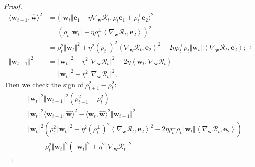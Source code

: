 \documentclass[pdflatex,sn-basic]{sn-jnl}%
\theoremstyle{thmstyleone}%
\begin{document}
\begin{appendices}
\begin{proof}
\begin{equation*}
  \begin{aligned}
    \langle \mathbf{w}_{t+1}, \hat{\mathbf{w}} \rangle^2 
    & = 
    \langle 
      \Vert \mathbf{w}_t \Vert \mathbf{e}_1 - \eta \nabla_{\mathbf{w}} \mathcal{R}_t, 
      \rho_t \mathbf{e}_1 + \rho_t^{\perp} \mathbf{e}_2
    \rangle^2 
    \\ & = 
    \left(
      \rho_t \Vert \mathbf{w}_t \Vert
      -
      \eta \rho_t^{\perp} \left\langle \nabla_{\mathbf{w}} \mathcal{R}_t, \mathbf{e}_2\right\rangle
    \right)^2
    \\ & = 
    \rho_t^2 \Vert \mathbf{w}_t \Vert^2
    +
    \eta^2 \left(\rho_t^{\perp}\right)^2 \left\langle \nabla_{\mathbf{w}} \mathcal{R}_t, \mathbf{e}_2 \right\rangle^2
    - 2 \eta \rho_t^{\perp}
    \rho_t \Vert \mathbf{w}_t \Vert
    \left\langle \nabla_{\mathbf{w}} \mathcal{R}_t, \mathbf{e}_2\right\rangle;
    \\
    \Vert \mathbf{w}_{t+1} \Vert^2 
    & = 
    \Vert \mathbf{w}_{t} \Vert^2
    + 
    \eta^2 \left\Vert \nabla_{\mathbf{w}} \mathcal{R}_t \right\Vert^2 
    - 
    2 \eta \left\langle \mathbf{w}_{t}, \nabla_{\mathbf{w}} \mathcal{R}_t\right\rangle 
    \\ & = 
    \Vert \mathbf{w}_{t} \Vert^2
    + 
    \eta^2 \left\Vert \nabla_{\mathbf{w}} \mathcal{R}_t \right\Vert^2,
  \end{aligned},
  \end{equation*}
  Then we check the sign of $\rho_{t+1}^2 - \rho_{t}^2$:
  \begin{equation*}
  \begin{aligned}
    & \Vert \mathbf{w}_t \Vert^2
    \Vert \mathbf{w}_{t+1} \Vert^2
    \left(
      \rho_{t+1}^2 - \rho_{t}^2
    \right)
    \\ = & 
    \Vert \mathbf{w}_t \Vert^2 \langle \mathbf{w}_{t+1}, \hat{\mathbf{w}} \rangle^2
    - 
    \langle \mathbf{w}_{t}, \hat{\mathbf{w}} \rangle^2 \Vert \mathbf{w}_{t+1} \Vert^2
    \\ = &
    \Vert \mathbf{w}_t \Vert^2 
    \left(
      \rho_t^2 \Vert \mathbf{w}_t \Vert^2
      +
      \eta^2 \left(\rho_t^{\perp}\right)^2 \left\langle \nabla_{\mathbf{w}} \mathcal{R}_t, \mathbf{e}_2 \right\rangle^2
      - 2 \eta \rho_t^{\perp}
      \rho_t \Vert \mathbf{w}_t \Vert
      \left\langle \nabla_{\mathbf{w}} \mathcal{R}_t, \mathbf{e}_2\right\rangle
    \right)
    \\ & \ \ \ \ \ \ -
    \rho_t^2 \Vert \mathbf{w}_t \Vert^2
    \left(
      \Vert \mathbf{w}_{t} \Vert^2
      + 
      \eta^2 \left\Vert \nabla_{\mathbf{w}} \mathcal{R}_t \right\Vert^2 

\end{aligned}
\end{equation*}
\end{proof}
\end{appendices}
\end{document}
